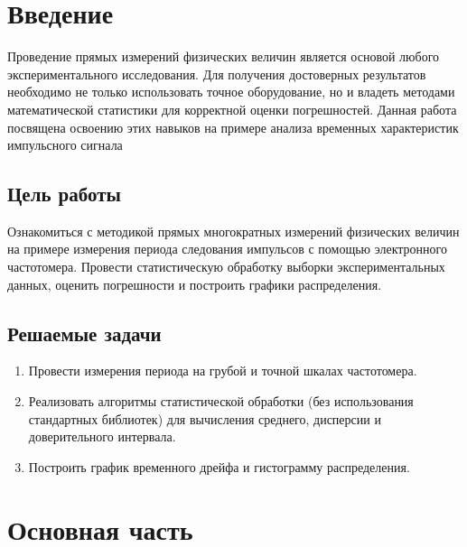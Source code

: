 \section{Введение}
Проведение прямых измерений физических величин является основой любого экспериментального исследования. Для получения достоверных результатов необходимо не только использовать точное оборудование, но и владеть методами математической статистики для корректной оценки погрешностей. Данная работа посвящена освоению этих навыков на примере анализа временных характеристик импульсного сигнала


\subsection{Цель работы}

Ознакомиться с методикой прямых многократных измерений физических величин на примере измерения периода следования импульсов с помощью электронного частотомера. Провести статистическую обработку выборки экспериментальных данных, оценить погрешности и построить графики распределения. 


\subsection{Решаемые задачи}
\begin{enumerate}
    \item Провести измерения периода на грубой и точной шкалах частотомера.
    \item Реализовать алгоритмы статистической обработки (без использования стандартных библиотек) для вычисления среднего, дисперсии и доверительного интервала.
    \item Построить график временного дрейфа и гистограмму распределения.
\end{enumerate}

\section{Основная часть}

